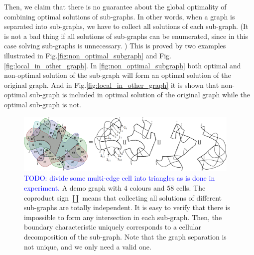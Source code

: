 \documentclass[conference]{IEEEtran}
\begin{document}
Then, we claim that there is no guarantee about the global optimality of combining optimal solutions of sub-graphs. In other words, when a graph is separated into sub-graphs, we have to collect all solutions of each sub-graph. (It is not a bad thing if all solutions of sub-graphs can be enumerated, since in this case solving sub-graphs is unnecessary. )
This is proved by two examples illustrated in Fig.\ref{fig:non_optimal_subgraph} and Fig.\ref{fig:local_in_other_graph}. In \ref{fig:non_optimal_subgraph} both optimal and non-optimal solution of the sub-graph will form an optimal solution of the original graph. And in Fig.\ref{fig:local_in_other_graph} it is shown that non-optimal sub-graph is included in optimal solution of the original graph while the optimal sub-graph is not. 

\begin{figure}[t]
\centering
\includegraphics[width=0.96\textwidth]{figures/complicated_graph/graph_separation_with_index}
\caption{\textcolor{blue}{TODO: divide some multi-edge cell into triangles as is done in experiment. }A demo graph with $4$ colours and $58$ cells. The coproduct sign $\coprod$ means that collecting all solutions of different sub-graphs are totally independent. It is easy to verify that there is impossible to form any intersection in each sub-graph. Then, the boundary characteristic uniquely corresponds to a cellular decomposition of the sub-graph. Note that the graph separation is not unique, and we only need a valid one. }\label{fig:complicated_graph}
\end{figure}
\end{document}
